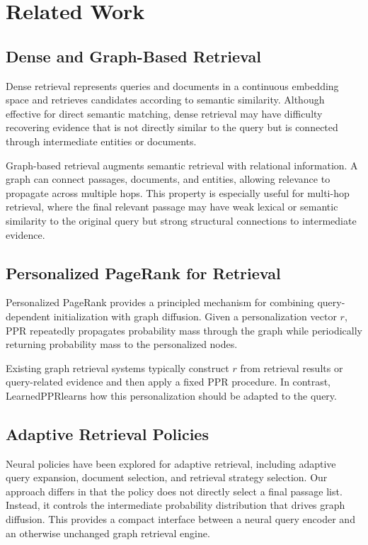 \documentclass[conference]{IEEEtran}
\newcommand{\method}{LearnedPPR}
\newcommand{\reset}{r}
\begin{document}
\section{Related Work}

\subsection{Dense and Graph-Based Retrieval}

Dense retrieval represents queries and documents in a continuous
embedding space and retrieves candidates according to semantic
similarity. Although effective for direct semantic matching, dense
retrieval may have difficulty recovering evidence that is not directly
similar to the query but is connected through intermediate entities or
documents.

Graph-based retrieval augments semantic retrieval with relational
information. A graph can connect passages, documents, and entities,
allowing relevance to propagate across multiple hops. This property
is especially useful for multi-hop retrieval, where the final relevant
passage may have weak lexical or semantic similarity to the original
query but strong structural connections to intermediate evidence.

\subsection{Personalized PageRank for Retrieval}

Personalized PageRank provides a principled mechanism for combining
query-dependent initialization with graph diffusion. Given a
personalization vector $\reset$, PPR repeatedly propagates probability
mass through the graph while periodically returning probability mass
to the personalized nodes.

Existing graph retrieval systems typically construct $\reset$ from
retrieval results or query-related evidence and then apply a fixed
PPR procedure. In contrast, \method learns how this personalization
should be adapted to the query.

\subsection{Adaptive Retrieval Policies}

Neural policies have been explored for adaptive retrieval, including
adaptive query expansion, document selection, and retrieval strategy
selection. Our approach differs in that the policy does not directly
select a final passage list. Instead, it controls the intermediate
probability distribution that drives graph diffusion. This provides a
compact interface between a neural query encoder and an otherwise
unchanged graph retrieval engine.
\end{document}
